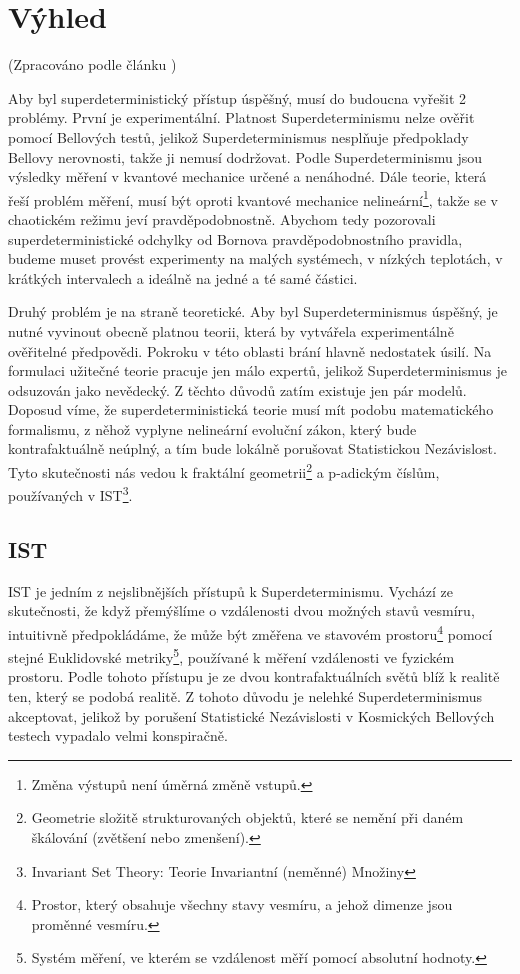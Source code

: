 \section{Výhled}
(Zpracováno podle článku \cite{supdet:rethink})

Aby byl superdeterministický přístup úspěšný, musí do budoucna vyřešit 2 problémy. První je experimentální. Platnost Superdeterminismu nelze ověřit pomocí Bellových testů, jelikož Superdeterminismus nesplňuje předpoklady Bellovy nerovnosti, takže ji nemusí dodržovat. Podle Superdeterminismu jsou výsledky měření v kvantové mechanice určené a nenáhodné. Dále teorie, která řeší problém měření, musí být oproti kvantové mechanice nelineární\footnote[17]{Změna výstupů není úměrná změně vstupů.}, takže se v chaotickém režimu jeví pravděpodobnostně. Abychom tedy pozorovali superdeterministické odchylky od Bornova pravděpodobnostního pravidla, budeme muset provést experimenty na malých systémech, v nízkých teplotách, v krátkých intervalech a ideálně na jedné a té samé částici. 

Druhý problém je na straně teoretické. Aby byl Superdeterminismus úspěšný, je nutné vyvinout obecně platnou teorii, která by vytvářela experimentálně ověřitelné předpovědi. Pokroku v této oblasti brání hlavně nedostatek úsilí. Na formulaci užitečné teorie pracuje jen málo expertů, jelikož Superdeterminismus je odsuzován jako nevědecký. Z těchto důvodů zatím existuje jen pár  modelů. Doposud víme, že superdeterministická teorie musí mít podobu matematického formalismu, z něhož vyplyne nelineární evoluční zákon, který bude kontrafaktuálně neúplný, a tím bude lokálně porušovat Statistickou Nezávislost. Tyto skutečnosti nás vedou k fraktální geometrii\footnote[18]{Geometrie složitě strukturovaných objektů, které se nemění při daném škálování (zvětšení nebo zmenšení).} a p-adickým číslům, používaných v IST\footnote[19]{Invariant Set Theory: Teorie Invariantní (neměnné) Množiny}. 

\subsection{IST}
IST je jedním z nejslibnějších přístupů k Superdeterminismu. Vychází ze skutečnosti, že když přemýšlíme o vzdálenosti dvou možných stavů vesmíru, intuitivně předpokládáme, že může být změřena ve stavovém prostoru\footnote[20]{Prostor, který obsahuje všechny stavy vesmíru, a jehož dimenze jsou proměnné vesmíru.} pomocí stejné Euklidovské metriky\footnote[21]{Systém měření, ve kterém se vzdálenost měří pomocí absolutní hodnoty.}, používané k měření vzdálenosti ve fyzickém prostoru. Podle tohoto přístupu je ze dvou kontrafaktuálních světů blíž k realitě ten, který se  podobá realitě. Z tohoto důvodu je nelehké Superdeterminismus akceptovat, jelikož by porušení Statistické Nezávislosti v Kosmických Bellových testech vypadalo velmi konspiračně.


